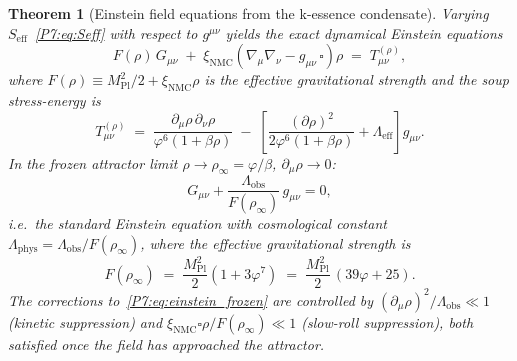 \documentclass[11pt,a4paper]{article}
\newtheorem{theorem}{Theorem}[section]
\theoremstyle{definition}
\theoremstyle{remark}
\newcommand{\vp}{\varphi}
\newcommand{\MPl}{M_{\mathrm{Pl}}}
\newcommand{\Lobs}{\Lambda_{\mathrm{obs}}}
\newcommand{\rinfty}{\rho_{\infty}}
\newcommand{\xNMC}{\xi_{\mathrm{NMC}}}
\begin{document}
\begin{theorem}[Einstein field equations from the k-essence condensate]
\label{P7:thm:einstein}
Varying $S_{\mathrm{eff}}$~\eqref{P7:eq:Seff} with respect to
$g^{\mu\nu}$ yields the exact dynamical Einstein equations
\begin{equation}
  F(\rho)\,G_{\mu\nu}
  \;+\; \xNMC\!\left(\nabla_\mu\nabla_\nu - g_{\mu\nu}\,\square\right)\rho
  \;=\; T_{\mu\nu}^{(\rho)},
  \label{P7:eq:einstein_full}
\end{equation}
where $F(\rho)\equiv\MPl^2/2 + \xNMC\rho$ is the effective gravitational
strength and the soup stress-energy is
\begin{equation}
  T_{\mu\nu}^{(\rho)}
  \;=\; \frac{\partial_\mu\rho\,\partial_\nu\rho}{\vp^6(1+\beta\rho)}
  \;-\; \left[\frac{(\partial\rho)^2}{2\vp^6(1+\beta\rho)}
             + \Lambda_{\mathrm{eff}}\right]g_{\mu\nu}.
  \label{P7:eq:Tmunu}
\end{equation}
In the \emph{frozen attractor limit} $\rho\to\rinfty=\vp/\beta$, $\partial_\mu\rho\to0$:
\begin{equation}
  \boxed{G_{\mu\nu} + \frac{\Lobs}{F(\rinfty)}\,g_{\mu\nu} = 0,}
  \label{P7:eq:einstein_frozen}
\end{equation}
i.e.\ the standard Einstein equation with cosmological constant
$\Lambda_{\mathrm{phys}}=\Lobs/F(\rinfty)$, where the effective
gravitational strength is
\begin{equation}
  F(\rinfty)
  \;=\; \frac{\MPl^2}{2}(1 + 3\vp^7)
  \;=\; \frac{\MPl^2}{2}\,(39\vp + 25).
  \label{P7:eq:Feff}
\end{equation}
The corrections to~\eqref{P7:eq:einstein_frozen} are controlled by
$(\partial_\mu\rho)^2/\Lobs \ll 1$ (kinetic suppression) and
$\xNMC\square\rho/F(\rinfty)\ll1$ (slow-roll suppression),
both satisfied once the field has approached the attractor.
\end{theorem}
\end{document}
